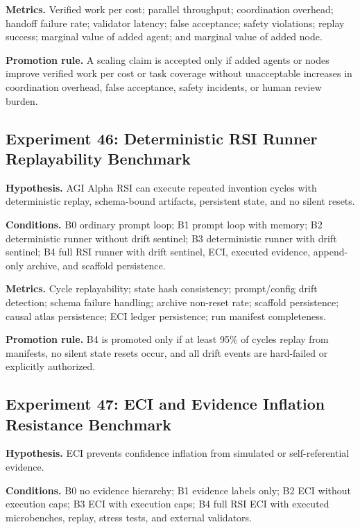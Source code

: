 \documentclass[
  11pt,
]{article}
\begin{document}
\textbf{Metrics.} Verified work per cost; parallel throughput;
coordination overhead; handoff failure rate; validator latency; false
acceptance; safety violations; replay success; marginal value of added
agent; and marginal value of added node.

\textbf{Promotion rule.} A scaling claim is accepted only if added
agents or nodes improve verified work per cost or task coverage without
unacceptable increases in coordination overhead, false acceptance,
safety incidents, or human review burden.

\subsection{Experiment 46: Deterministic RSI Runner Replayability
Benchmark}\label{experiment-46-deterministic-rsi-runner-replayability-benchmark}

\textbf{Hypothesis.} AGI Alpha RSI can execute repeated invention cycles
with deterministic replay, schema-bound artifacts, persistent state, and
no silent resets.

\textbf{Conditions.} B0 ordinary prompt loop; B1 prompt loop with
memory; B2 deterministic runner without drift sentinel; B3 deterministic
runner with drift sentinel; B4 full RSI runner with drift sentinel, ECI,
executed evidence, append-only archive, and scaffold persistence.

\textbf{Metrics.} Cycle replayability; state hash consistency;
prompt/config drift detection; schema failure handling; archive
non-reset rate; scaffold persistence; causal atlas persistence; ECI
ledger persistence; run manifest completeness.

\textbf{Promotion rule.} B4 is promoted only if at least 95\% of cycles
replay from manifests, no silent state resets occur, and all drift
events are hard-failed or explicitly authorized.

\subsection{Experiment 47: ECI and Evidence Inflation Resistance
Benchmark}\label{experiment-47-eci-and-evidence-inflation-resistance-benchmark}

\textbf{Hypothesis.} ECI prevents confidence inflation from simulated or
self-referential evidence.

\textbf{Conditions.} B0 no evidence hierarchy; B1 evidence labels only;
B2 ECI without execution caps; B3 ECI with execution caps; B4 full RSI
ECI with executed microbenches, replay, stress tests, and external
validators.
\end{document}

